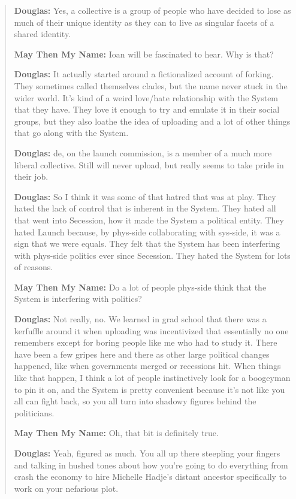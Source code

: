 \begin{quote}
\textbf{Douglas:} Yes, a collective is a group of people who have decided to lose as much of their unique identity as they can to live as singular facets of a shared identity.

\textbf{May Then My Name:} Ioan will be fascinated to hear. Why is that?

\textbf{Douglas:} It actually started around a fictionalized account of forking. They sometimes called themselves clades, but the name never stuck in the wider world. It's kind of a weird love/hate relationship with the System that they have. They love it enough to try and emulate it in their social groups, but they also loathe the idea of uploading and a lot of other things that go along with the System.

\textbf{Douglas:} de, on the launch commission, is a member of a much more liberal collective. Still will never upload, but really seems to take pride in their job.

\textbf{Douglas:} So I think it was some of that hatred that was at play. They hated the lack of control that is inherent in the System. They hated all that went into Secession, how it made the System a political entity. They hated Launch because, by phys-side collaborating with sys-side, it was a sign that we were equals. They felt that the System has been interfering with phys-side politics ever since Secession. They hated the System for lots of reasons.

\textbf{May Then My Name:} Do a lot of people phys-side think that the System is interfering with politics?

\textbf{Douglas:} Not really, no. We learned in grad school that there was a kerfuffle around it when uploading was incentivized that essentially no one remembers except for boring people like me who had to study it. There have been a few gripes here and there as other large political changes happened, like when governments merged or recessions hit. When things like that happen, I think a lot of people instinctively look for a boogeyman to pin it on, and the System is pretty convenient because it's not like you all can fight back, so you all turn into shadowy figures behind the politicians.

\textbf{May Then My Name:} Oh, that bit is definitely true.

\textbf{Douglas:} Yeah, figured as much. You all up there steepling your fingers and talking in hushed tones about how you're going to do everything from crash the economy to hire Michelle Hadje's distant ancestor specifically to work on your nefarious plot.


\end{quote}
